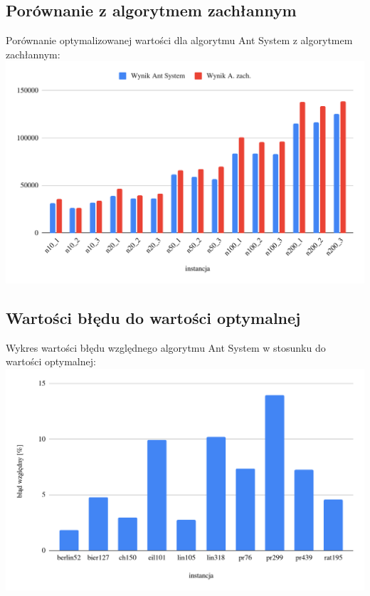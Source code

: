 \documentclass[11pt]{article}
\begin{document}
\subsection{Porównanie z algorytmem zachłannym}\label{sub:} %
Porównanie optymalizowanej wartości dla algorytmu Ant System z algorytmem zachłannym:\\
\includegraphics[scale=0.35]{images/greedy.png}

\subsection{Wartości błędu do wartości optymalnej}\label{sub:blad} %
Wykres wartości błędu względnego algorytmu Ant System w stosunku do wartości optymalnej:\\
\includegraphics[scale=0.35]{images/error.png}
\end{document}
